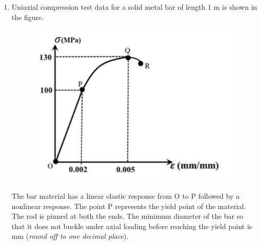 \documentclass[12pt,onecolumn]{article}
\begin{document}
\begin{enumerate}
    \item Uniaxial compression test data for a solid metal bar of length 1 m is shown in the figure.
          \begin{figure}[H]
              \centering
              \includegraphics[scale=0.4]{q38s2}
              \label{fig:q38s2}
          \end{figure}
          The bar material has a linear elastic response from O to P followed by a nonlinear response. The point P represents the yield point of the material. The rod is pinned at both the ends. The minimum diameter of the bar so that it does not buckle under axial loading before reaching the yield point is \underline{\hspace{2cm}} mm (\textit{round off to one decimal place}).


\end{enumerate}
\end{document}
